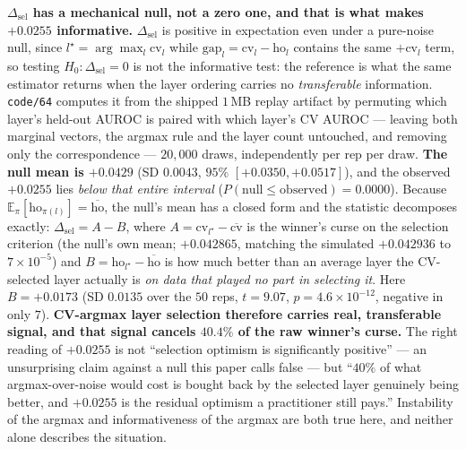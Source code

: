 \documentclass[10pt]{article} %
\begin{document}
\textbf{$\Delta_{\text{sel}}$ has a mechanical null, not a zero one, and that
is what makes $+0.0255$ informative.} $\Delta_{\text{sel}}$ is positive in
expectation even under a pure-noise null, since $l^\star=\arg\max_l\text{cv}_l$
while $\text{gap}_l=\text{cv}_l-\text{ho}_l$ contains the same $+\text{cv}_l$
term, so testing $H_0:\Delta_{\text{sel}}=0$ is not the informative test: the
reference is what the same estimator returns when the layer ordering carries no
\emph{transferable} information. \texttt{code/64} computes it from the shipped
$1$\,MB replay artifact by permuting which layer's held-out AUROC is paired
with which layer's CV AUROC --- leaving both marginal vectors, the argmax rule
and the layer count untouched, and removing only the correspondence ---
$20{,}000$ draws, independently per rep per draw. \textbf{The null mean is
$+0.0429$} (SD $0.0043$, $95\%$ $[+0.0350,+0.0517]$), and the observed
$+0.0255$ lies \emph{below that entire interval}
($P(\text{null}\leq\text{observed})=0.0000$). Because
$\mathbb{E}_\pi[\text{ho}_{\pi(l)}]=\overline{\text{ho}}$, the null's mean has
a closed form and the statistic decomposes exactly:
$\Delta_{\text{sel}}=A-B$, where $A=\text{cv}_{l^\star}-\overline{\text{cv}}$
is the winner's curse on the selection criterion (the null's own mean;
$+0.042865$, matching the simulated $+0.042936$ to $7\times10^{-5}$) and
$B=\text{ho}_{l^\star}-\overline{\text{ho}}$ is how much better than an average
layer the CV-selected layer actually is \emph{on data that played no part in
selecting it}. Here $B=+0.0173$ (SD $0.0135$ over the $50$ reps, $t=9.07$,
$p=4.6\times10^{-12}$, negative in only $7$). \textbf{CV-argmax layer selection
therefore carries real, transferable signal, and that signal cancels $40.4\%$
of the raw winner's curse.} The right reading of $+0.0255$ is not ``selection
optimism is significantly positive'' --- an unsurprising claim against a null
this paper calls false --- but ``$40\%$ of what argmax-over-noise would cost is
bought back by the selected layer genuinely being better, and $+0.0255$ is the
residual optimism a practitioner still pays.'' Instability of the argmax and
informativeness of the argmax are both true here, and neither alone describes
the situation.
\end{document}
